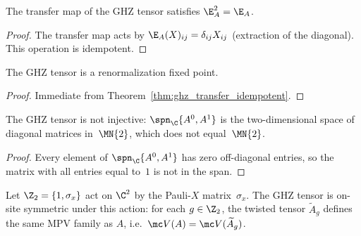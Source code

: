 \begin{theorem}\label{thm:ghz_transfer_idempotent}
    \leanok
    The transfer map of the GHZ tensor satisfies $\E_A^2 = \E_A$.
\end{theorem}

\begin{proof}
    \leanok
    The transfer map acts by
    $\E_A(X)_{ij} = \delta_{ij} X_{ij}$
    (extraction of the diagonal).
    This operation is idempotent.
\end{proof}

\begin{theorem}\label{thm:ghz_is_rfp}
    \leanok
    The GHZ tensor is a renormalization fixed point.
\end{theorem}

\begin{proof}
    \leanok
    Immediate from Theorem~\ref{thm:ghz_transfer_idempotent}.
\end{proof}

\begin{theorem}\label{thm:ghz_not_injective}
    \leanok
    The GHZ tensor is not injective: $\spn_{\C}\{A^0, A^1\}$ is the
    two-dimensional space of diagonal matrices in~$\MN{2}$, which does
    not equal~$\MN{2}$.
\end{theorem}

\begin{proof}
    \leanok
    Every element of $\spn_{\C}\{A^0, A^1\}$ has zero off-diagonal
    entries, so the matrix with all entries equal to~$1$ is not in the
    span.
\end{proof}

\begin{theorem}\label{thm:ghz_z2_symmetric}
    \leanok
    Let $\Z_2 = \{1, \sigma_x\}$ act on $\C^2$ by the Pauli-$X$
    matrix~$\sigma_x$. The GHZ tensor is on-site symmetric under this
    action: for each $g \in \Z_2$, the twisted tensor $\widetilde A_g$
    defines the same MPV family as $A$, i.e.\ $\mc V(A)=\mc V(\widetilde
        A_g)$.
\end{theorem}

